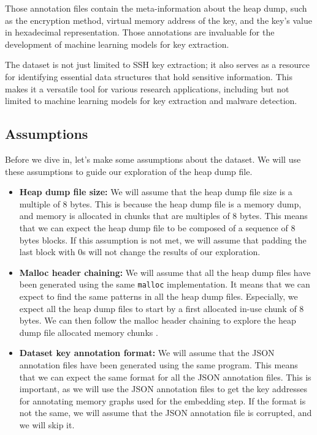     Those annotation files contain the meta-information about the heap dump, such as the encryption method, virtual memory address of the key, and the key's value in hexadecimal representation. Those annotations are invaluable for the development of machine learning models for key extraction. 

    The dataset is not just limited to SSH key extraction; it also serves as a resource for identifying essential data structures that hold sensitive information. This makes it a versatile tool for various research applications, including but not limited to machine learning models for key extraction and malware detection. 

    \subsection{Assumptions}
    Before we dive in, let's make some assumptions about the dataset. We will use these assumptions to guide our exploration of the heap dump file. 

    \begin{itemize}
        \item \textbf{Heap dump file size:} We will assume that the heap dump file size is a multiple of 8 bytes. This is because the heap dump file is a memory dump, and memory is allocated in chunks that are multiples of 8 bytes. This means that we can expect the heap dump file to be composed of a sequence of 8 bytes blocks. If this assumption is not met, we will assume that padding the last block with 0s will not change the results of our exploration.
        \item \textbf{Malloc header chaining:} We will assume that all the heap dump files have been generated using the same \lstinline[language=c]|malloc| implementation. It means that we can expect to find the same patterns in all the heap dump files. Especially, we expect all the heap dump files to start by a first allocated in-use chunk of 8 bytes. We can then follow the malloc header chaining to explore the heap dump file allocated memory chunks \cite{MallocInternalsWiki2023}.
        \item \textbf{Dataset key annotation format:} We will assume that the JSON annotation files have been generated using the same program. This means that we can expect the same format for all the JSON annotation files. This is important, as we will use the JSON annotation files to get the key addresses for annotating memory graphs used for the embedding step. If the format is not the same, we will assume that the JSON annotation file is corrupted, and we will skip it.
    \end{itemize}

